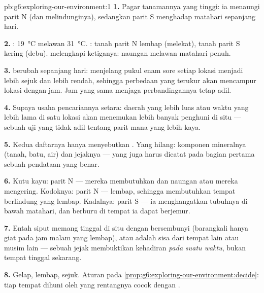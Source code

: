 \begin{solution}{pb:g6:exploring-our-environment:1}
\textbf{1.} Pagar tanamannya yang tinggi: ia menaungi parit N (dan
melindunginya), sedangkan parit S menghadap matahari sepanjang hari.

\textbf{2.} : \qty{19}{\degreeCelsius} melawan
\qty{31}{\degreeCelsius}. : tanah parit N lembap (melekat),
tanah parit S kering (debu).  melengkapi ketiganya: naungan
melawan matahari penuh.

\textbf{3.}  berubah sepanjang hari: menjelang pukul enam sore
setiap lokasi menjadi lebih sejuk dan  lebih rendah, sehingga
perbedaan yang terukur akan mencampur lokasi dengan jam. Jam yang sama
menjaga perbandingannya tetap adil.

\textbf{4.} Supaya usaha pencariannya setara: daerah yang lebih luas
atau waktu yang lebih lama di satu lokasi akan menemukan lebih banyak
penghuni di situ --- sebuah uji yang tidak adil tentang parit mana
yang lebih kaya.

\textbf{5.} Kedua daftarnya hanya menyebutkan . Yang
hilang: komponen mineralnya (tanah, batu, air) dan jejaknya --- yang
juga harus dicatat pada bagian pertama sebuah pendataan yang benar.

\textbf{6.} Kutu kayu: parit N --- mereka membutuhkan  dan
naungan atau mereka mengering. Kodoknya: parit N ---  lembap,
sehingga membutuhkan tempat berlindung yang lembap. Kadalnya: parit S
--- ia menghangatkan tubuhnya di bawah matahari, dan berburu di tempat
ia dapat berjemur.

\textbf{7.} Entah siput memang tinggal di situ dengan bersembunyi
(barangkali hanya giat pada jam malam yang lembap), atau 
adalah sisa dari tempat lain atau musim lain --- sebuah jejak
membuktikan kehadiran \emph{pada suatu waktu}, bukan tempat tinggal
sekarang.

\textbf{8.} Gelap, lembap, sejuk. Aturan pada
\cref{prop:g6:exploring-our-environment:decide}: tiap tempat dihuni
oleh  yang rentangnya cocok dengan .


\end{solution}
